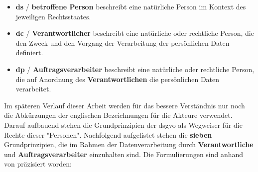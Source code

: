 \begin{itemize}
\item \textbf{\acl{ds}} / \textbf{betroffene Person} beschreibt eine natürliche Person im Kontext des jeweiligen Rechtsstaates.
\item \textbf{\acl{dc}} / \textbf{Verantwortlicher} beschreibt eine natürliche oder rechtliche Person, die den Zweck und den Vorgang der Verarbeitung der persönlichen Daten definiert.
\item \textbf{\acl{dp}} / \textbf{Auftragsverarbeiter} beschreibt eine natürliche oder rechtliche Person, die auf Anordnung des \textbf{Verantwortlichen} die persönlichen Daten verarbeitet.
\end{itemize}

Im späteren Verlauf dieser Arbeit werden für das bessere Verständnis nur noch die Abkürzungen der englischen Bezeichnungen für die Akteure verwendet. Darauf aufbauend stehen die Grundprinzipien der \ac{dsgvo} als Wegweiser für die Rechte dieser "Personen". Nachfolgend aufgelistet stehen die \textbf{sieben} Grundprinzipien, die im Rahmen der Datenverarbeitung durch \textbf{Verantwortliche} und \textbf{Auftragsverarbeiter} einzuhalten sind. Die Formulierungen sind anhand von \cite{DSGVOArt5} präzisiert worden:

